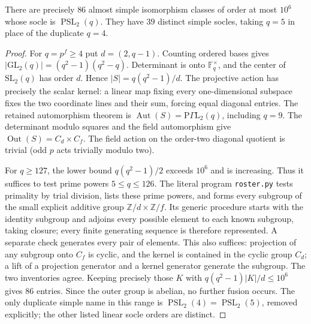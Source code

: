 \documentclass[11pt]{article}
\newcommand{\PSL}{\operatorname{PSL}}\newcommand{\Aut}{\operatorname{Aut}}
\newcommand{\Out}{\operatorname{Out}}
\begin{document}
\begin{lemma}
There are precisely $86$ almost simple isomorphism classes of order at
most $10^6$ whose socle is $\PSL_2(q)$. They have $39$ distinct simple
socles, taking $q=5$ in place of the duplicate $q=4$.
\end{lemma}
\begin{proof}
For $q=p^f\geq4$ put $d=(2,q-1)$. Counting ordered bases gives
$|\mathrm{GL}_2(q)|=(q^2-1)(q^2-q)$. Determinant is onto
$\mathbb F_q^\times$, and the center of $\mathrm{SL}_2(q)$ has
order $d$. Hence $|S|=q(q^2-1)/d$. The projective action has precisely
the scalar kernel: a linear map fixing every one-dimensional subspace
fixes the two coordinate lines and their sum, forcing equal diagonal
entries. The retained automorphism theorem is
$\Aut(S)=\mathrm{P}\Gamma\mathrm L_2(q)$, including $q=9$.
The determinant modulo squares and the field automorphism give
$\Out(S)=C_d\times C_f$. The field action on the order-two diagonal
quotient is trivial (odd $p$ acts trivially modulo two).

For $q\geq127$, the lower bound $q(q^2-1)/2$ exceeds $10^6$ and
is increasing. Thus it suffices to test prime powers $5\leq q\leq126$.
The literal program \texttt{roster.py} tests primality by trial division,
lists these prime powers, and forms every subgroup of the small explicit
additive group $\mathbb Z/d\times\mathbb Z/f$. Its generic procedure
starts with the identity subgroup and adjoins every possible element to
each known subgroup, taking closure; every finite generating sequence is
therefore represented. A separate check generates every pair of elements.
This also suffices: projection of any subgroup onto $C_f$ is cyclic,
and the kernel is contained in the cyclic group $C_d$; a lift of a
projection generator and a kernel generator generate the subgroup.
The two inventories agree. Keeping precisely those $K$ with
$q(q^2-1)|K|/d\leq10^6$ gives $86$ entries. Since the outer group is
abelian, no further fusion occurs. The only duplicate simple name in
this range is $\PSL_2(4)=\PSL_2(5)$, removed explicitly; the other
listed linear socle orders are distinct.
\end{proof}
\end{document}
